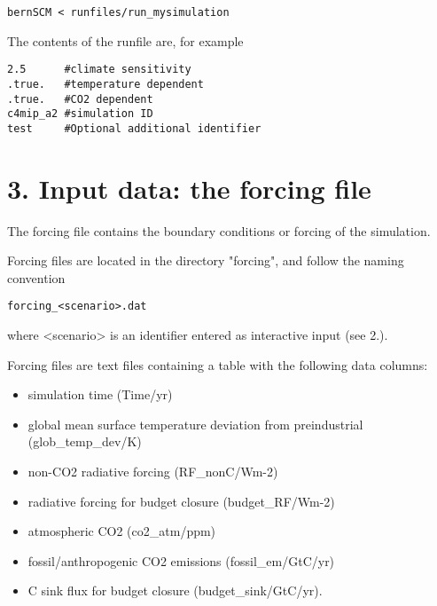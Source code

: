 \documentclass[11pt]{article}
\begin{document}
\begin{verbatim}
bernSCM < runfiles/run_mysimulation
\end{verbatim}

The contents of the runfile are, for example
\begin{verbatim}
2.5      #climate sensitivity
.true.   #temperature dependent
.true.   #CO2 dependent
c4mip_a2 #simulation ID
test     #Optional additional identifier
\end{verbatim}


\section*{3. Input data: the forcing file}
\label{sec-4}

The forcing file contains the boundary conditions or forcing of the simulation. 

Forcing files are located in the directory "forcing", and follow the naming convention
\begin{verbatim}
forcing_<scenario>.dat
\end{verbatim}
where <scenario> is an identifier entered as interactive input (see 2.).

Forcing files are text files containing a table with the following data columns: 
\begin{itemize}
\item simulation time (Time/yr)
\item global mean surface temperature deviation from preindustrial (glob\_temp\_dev/K)
\item non-CO2 radiative forcing (RF\_nonC/Wm-2)
\item radiative forcing for budget closure (budget\_RF/Wm-2)
\item atmospheric CO2 (co2\_atm/ppm)
\item fossil/anthropogenic CO2 emissions (fossil\_em/GtC/yr)
\item C sink flux for budget closure (budget\_sink/GtC/yr).
\end{itemize}
\end{document}
